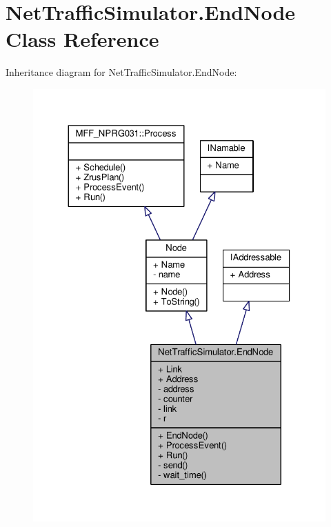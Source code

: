 \hypertarget{classNetTrafficSimulator_1_1EndNode}{\section{Net\-Traffic\-Simulator.\-End\-Node Class Reference}
\label{classNetTrafficSimulator_1_1EndNode}
}


Inheritance diagram for Net\-Traffic\-Simulator.\-End\-Node\-:\nopagebreak
\begin{figure}[H]
\begin{center}
\leavevmode
\includegraphics[width=326pt]{classNetTrafficSimulator_1_1EndNode__inherit__graph}
\end{center}
\end{figure}


